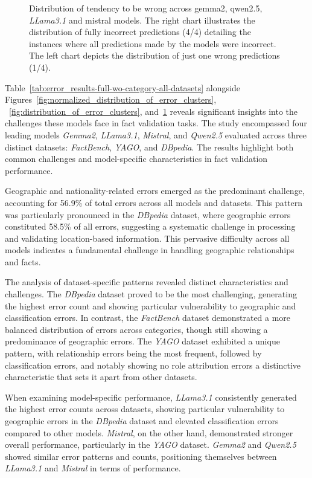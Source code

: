 \begin{figure}[ht!]
\begin{minipage}[b]{0.42\textwidth}
    \end{minipage}
    \caption{Distribution of tendency to be wrong across gemma2, qwen2.5, \textit{LLama3.1} and mistral models. The right chart illustrates the distribution of fully incorrect predictions (4/4) detailing the instances where all predictions made by the models were incorrect. The left chart depicts the distribution of just one wrong predictions (1/4).}
    \label{fig:distribution_of_error_clusters_1_4}
\end{figure}

Table~\ref{tab:error_results-full-wo-category-all-datasets} alongside Figures~\ref{fig:normalized_distribution_of_error_clusters}, ~\ref{fig:distribution_of_error_clusters}, and~\ref{fig:distribution_of_error_clusters_1_4} reveals significant insights into the challenges these models face in fact validation tasks.
The study encompassed four leading models \textit{Gemma2}, \textit{LLama3.1}, \textit{Mistral}, and \textit{Qwen2.5} evaluated across three distinct datasets: \textit{FactBench}, \textit{YAGO}, and \textit{DBpedia}.
The results highlight both common challenges and model-specific characteristics in fact validation performance.

Geographic and nationality-related errors emerged as the predominant challenge, accounting for 56.9\% of total errors across all models and datasets.
This pattern was particularly pronounced in the \textit{DBpedia} dataset, where geographic errors constituted 58.5\% of all errors, suggesting a systematic challenge in processing and validating location-based information.
This pervasive difficulty across all models indicates a fundamental challenge in handling geographic relationships and facts.

The analysis of dataset-specific patterns revealed distinct characteristics and challenges.
The \textit{DBpedia} dataset proved to be the most challenging, generating the highest error count and showing particular vulnerability to geographic and classification errors.
In contrast, the \textit{FactBench} dataset demonstrated a more balanced distribution of errors across categories, though still showing a predominance of geographic errors.
The \textit{YAGO} dataset exhibited a unique pattern, with relationship errors being the most frequent, followed by classification errors, and notably showing no role attribution errors a distinctive characteristic that sets it apart from other datasets.

When examining model-specific performance, \textit{LLama3.1} consistently generated the highest error counts across datasets, showing particular vulnerability to geographic errors in the \textit{DBpedia} dataset and elevated classification errors compared to other models.
\textit{Mistral}, on the other hand, demonstrated stronger overall performance, particularly in the \textit{YAGO} dataset.
\textit{Gemma2} and \textit{Qwen2.5} showed similar error patterns and counts, positioning themselves between \textit{LLama3.1} and \textit{Mistral} in terms of performance.

